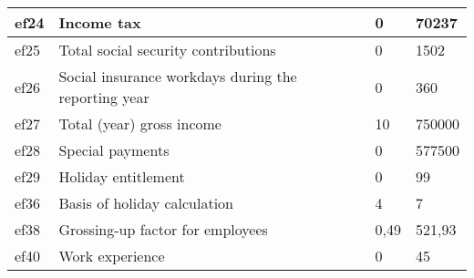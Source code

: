 \begin{table}[H]
\begin{tabular}{|l|l|l|l|}
ef24     & Income tax                                          & 0    & 70237  \\ \hline
ef25     & Total social security contributions                 & 0    & 1502   \\ \hline
ef26     & Social insurance workdays during the reporting year & 0    & 360    \\ \hline
ef27     & Total (year) gross income                           & 10   & 750000 \\ \hline
ef28     & Special payments                                    & 0    & 577500 \\ \hline
ef29     & Holiday entitlement                                 & 0    & 99     \\ \hline
ef36     & Basis of holiday calculation                        & 4    & 7      \\ \hline
ef38     & Grossing-up factor for employees                    & 0,49 & 521,93 \\ \hline
ef40     & Work experience                                     & 0    & 45     \\ \hline
\end{tabular}
\end{table}

